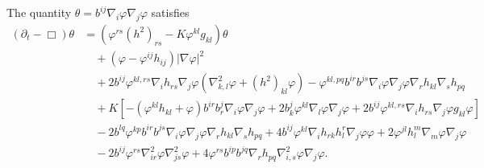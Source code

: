 \documentclass{amsart}
\begin{document}
\begin{lemma}
\label{lem:Evtheta}
The quantity $\theta = b^{ij}\nabla_i \varphi\nabla_j\varphi$ satisfies
\[
\begin{split}
(\partial_{t} - \Box)\theta &= (\varphi^{rs}(h^2)_{rs} - K\varphi^{kl}g_{kl})\theta \\
&\quad + (\varphi - \varphi^{ij}h_{ij})|\nabla\varphi|^{2} \\
&\quad + 2b^{ij}\varphi^{kl,rs}\nabla_i h_{rs}\nabla_j\varphi (\nabla^2_{k,l} \varphi + (h^2)_{kl}\varphi) - \varphi^{kl,pq}b^{ir}b^{js}\nabla_i \varphi\nabla_j\varphi \nabla_r h_{kl} \nabla_s h_{pq} \\
&\quad + K\left[-(\varphi^{kl}h_{kl} + \varphi)b^{ir}b^{j}_{r}\nabla_i \varphi\nabla_j\varphi + 2 b^{j}_{k}\varphi^{kl}\nabla_l\varphi\nabla_j\varphi + 2 b^{ij}\varphi^{kl,rs}\nabla_i h_{rs}\nabla_j\varphi g_{kl}\varphi\right] \\
&\quad - 2b^{lq}\varphi^{kp} b^{ir}b^{js}\nabla_i \varphi\nabla_j\varphi \nabla_r h_{kl} \nabla_s h_{pq} + 4b^{ij}\varphi^{kl}\nabla_i h_{rk}h^{r}_{l}\nabla_j \varphi\varphi + 2\varphi^{jl}h^{m}_{l}\nabla_m\varphi\nabla_j\varphi \\
&\quad - 2b^{ij}\varphi^{rs}\nabla^2_{ir}\varphi\nabla^2_{js}\varphi + 4\varphi^{rs}b^{ip}b^{jq}\nabla_r h_{pq}\nabla^2_{i,s} \varphi \nabla_j\varphi.
\end{split}
\]
\end{lemma}
\end{document}
